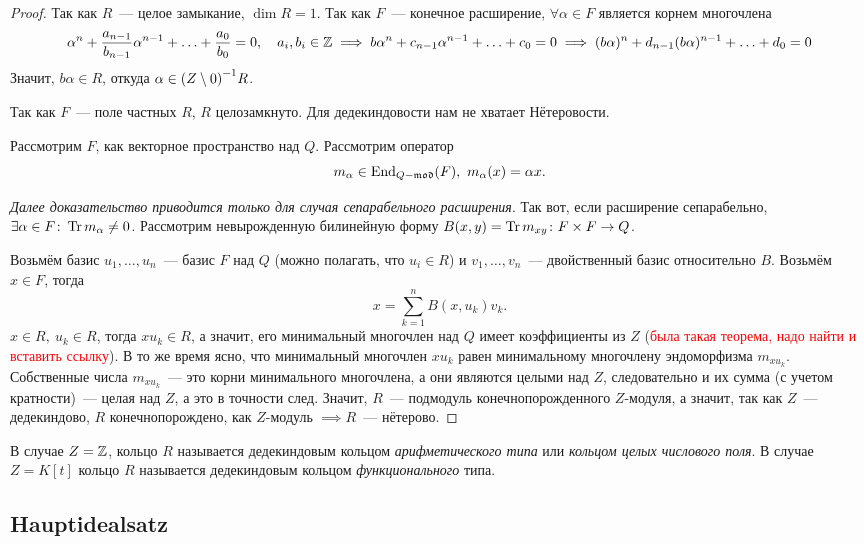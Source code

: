 	\begin{proof}
		Так как $R$~--- целое замыкание, $\dim{R} = 1$. Так как $F$~--- конечное расширение, $\forall \alpha \in F$ является корнем многочлена 
		\[
			\alpha^n + \frac{a_{n - 1}}{b_{n - 1}}\alpha^{n - 1} + \ldots + \frac{a_0}{b_0} = 0, \quad a_i, b_i \in \mathbb{Z} \implies b \alpha^n + c_{n - 1} \alpha^{n - 1} + \ldots + c_0 = 0 \implies (b\alpha)^n + d_{n - 1} (b\alpha)^{n - 1} + \ldots + d_0 = 0
		\]
		Значит, $b\alpha \in R$, откуда $\alpha \in \lr*{Z \setminus 0}^{-1}R$.

		Так как $F$~--- поле частных $R$, $R$ целозамкнуто. Для дедекиндовости нам не хватает Нётеровости. 

		Рассмотрим $F$, как векторное пространство над $Q$. Рассмотрим оператор 
		\[
			m_{\alpha} \in \End_{Q-\fm \fo \fd}\lr*{F}, \ m_{\alpha}(x) = \alpha x.
		\]

		\emph{Далее доказательство приводится только для случая сепарабельного расширения}. 
		Так вот, если расширение сепарабельно, $\exists \alpha\in F \colon \operatorname{Tr}{m_{\alpha}} \neq 0$. Рассмотрим невырожденную билинейную форму $B(x, y) = \operatorname{Tr}{m_{xy}}\colon F \times F \to Q$.

		Возьмём базис $u_1, \ldots, u_n$~--- базис $F$ над $Q$ (можно полагать, что $u_i \in R$) и $v_1, \ldots, v_n$~--- двойственный базис относительно $B$. Возьмём $x \in F$, тогда 
		\[
			x = \sum_{k = 1}^{n} B(x, u_k) v_k.
		\]
		$x \in R, \ u_k \in R$, тогда $x u_k \in R$, а значит, его минимальный многочлен над $Q$ имеет коэффициенты из $Z$ (\textcolor{red}{была такая теорема, надо найти и вставить ссылку}). В то же время ясно, что минимальный многочлен $x u_k$ равен минимальному многочлену эндоморфизма $m_{x u_k}$. Собственные числа $m_{x u_k}$~--- это корни минимального многочлена, а они являются целыми над $Z$, следовательно и их сумма (с учетом кратности)~--- целая над $Z$, а это в точности след. Значит, $R$~--- подмодуль конечнопорожденного $Z$-модуля, а значит, так как $Z$~--- дедекиндово, $R$ конечнопорождено, как $Z$-модуль $\implies R$~--- нётерово.  
	\end{proof}

	В случае $Z = \mathbb{Z}$, кольцо $R$ называется дедекиндовым кольцом \emph{арифметического типа} или \emph{кольцом целых числового поля}. В случае $Z = K[t]$ кольцо $R$ называется дедекиндовым кольцом \emph{функционального} типа. 

	\subsection{Hauptidealsatz}


